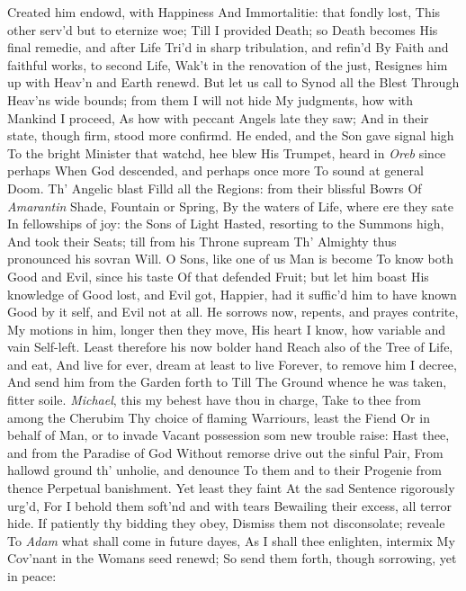 \documentclass[11pt]{book}
\newcounter {last}
\begin{document}
Created him endowd, with Happiness 
And Immortalitie: that fondly lost, 
This other serv'd but to eternize woe; 
Till I provided Death; so Death becomes 
His final remedie, and after Life 
Tri'd in sharp tribulation, and refin'd 
By Faith and faithful works, to second Life, 
Wak't in the renovation of the just, 
Resignes him up with Heav'n and Earth renewd. 
But let us call to Synod all the Blest 
Through Heav'ns wide bounds; from them I will not hide 
My judgments, how with Mankind I proceed, 
As how with peccant Angels late they saw; 
And in their state, though firm, stood more confirmd. 
\quad He ended, and the Son gave signal high 
To the bright Minister that watchd, hee blew 
His Trumpet, heard in \textit{Oreb} since perhaps 
When God descended, and perhaps once more 
To sound at general Doom.  Th' Angelic blast 
Filld all the Regions: from their blissful Bowrs 
Of \textit{Amarantin} Shade, Fountain or Spring, 
By the waters of Life, where ere they sate 
In fellowships of joy: the Sons of Light 
Hasted, resorting to the Summons high, 
And took their Seats; till from his Throne supream 
Th' Almighty thus pronounced his sovran Will. 
\quad O Sons, like one of us Man is become 
To know both Good and Evil, since his taste 
Of that defended Fruit; but let him boast 
His knowledge of Good lost, and Evil got, 
Happier, had it suffic'd him to have known 
Good by it self, and Evil not at all. 
He sorrows now, repents, and prayes contrite, 
My motions in him, longer then they move, 
His heart I know, how variable and vain 
Self-left.  Least therefore his now bolder hand 
Reach also of the Tree of Life, and eat, 
And live for ever, dream at least to live 
Forever, to remove him I decree, 
And send him from the Garden forth to Till 
The Ground whence he was taken, fitter soile. 
\quad \textit{Michael}, this my behest have thou in charge, 
Take to thee from among the Cherubim 
Thy choice of flaming Warriours, least the Fiend 
Or in behalf of Man, or to invade 
Vacant possession som new trouble raise: 
Hast thee, and from the Paradise of God 
Without remorse drive out the sinful Pair, 
From hallowd ground th' unholie, and denounce 
To them and to their Progenie from thence 
Perpetual banishment.  Yet least they faint 
At the sad Sentence rigorously urg'd, 
For I behold them soft'nd and with tears 
Bewailing their excess, all terror hide. 
If patiently thy bidding they obey, 
Dismiss them not disconsolate; reveale 
To \textit{Adam} what shall come in future dayes, 
As I shall thee enlighten, intermix 
My Cov'nant in the Womans seed renewd; 
So send them forth, though sorrowing, yet in peace: 
\end{document}
